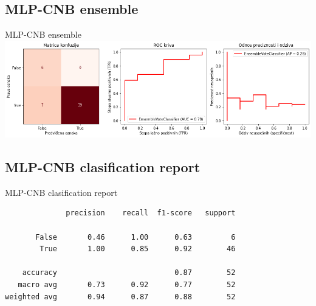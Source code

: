 \documentclass[hyperref={bookmarks=false}]{beamer}
\begin{document}
\subsection{MLP-CNB ensemble}
\begin{frame}{MLP-CNB ensemble}
\includegraphics[width=\textwidth]{mlpcnb.png}
\end{frame}

\subsection{MLP-CNB clasification report}
\begin{frame}[fragile]{MLP-CNB clasification report}
\begin{lstlisting}
              precision    recall  f1-score   support

       False       0.46      1.00      0.63         6
        True       1.00      0.85      0.92        46

    accuracy                           0.87        52
   macro avg       0.73      0.92      0.77        52
weighted avg       0.94      0.87      0.88        52
\end{lstlisting}
\end{frame}
\end{document}
